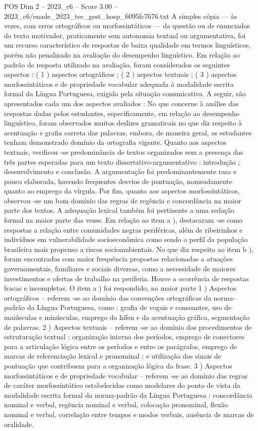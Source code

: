 \begin{textsample}{POS Dim 2 – 2023\_c6 – Score 3.00 – 2023\_c6/enade\_2023\_tec\_gest\_hosp\_6095fc7676.txt}
A simples cópia — às vezes, com erros ortográficos ou morfossintáticos — da questão ou de enunciados do texto motivador, praticamente sem autonomia textual ou argumentativa, foi um recurso característico de respostas de baixa qualidade em termos linguísticos, porém não penalizado na avaliação do desempenho linguístico.
Em relação ao padrão de resposta utilizado na avaliação, foram considerados os seguintes aspectos : ( 1 ) aspectos ortográficos ; ( 2 ) aspectos textuais ; ( 3 ) aspectos morfossintáticos e de propriedade vocabular adequada à modalidade escrita formal da Língua Portuguesa, exigida pela situação comunicativa.
A seguir, são apresentados cada um dos aspectos avaliados : No que concerne à análise das respostas dadas pelos estudantes, especificamente, em relação ao desempenho linguístico, foram observados muitos deslizes gramaticais no que diz respeito à acentuação e grafia correta das palavras, embora, de maneira geral, os estudantes tenham demonstrado domínio da ortografia vigente.
Quanto aos aspectos textuais, verificou -se predominância de textos organizados sem a presença das três partes esperadas para um texto dissertativo-argumentativo : introdução ; desenvolvimento e conclusão.
A argumentação foi predominantemente rasa e pouco elaborada, havendo frequentes desvios de pontuação, nomeadamente quanto ao emprego da vírgula.
Por fim, quanto aos aspectos morfossintáticos, observou -se um bom domínio das regras de regência e concordância na maior parte dos textos.
A adequação lexical também foi pertinente a uma redação formal na maior parte das vezes.
Em relação ao item a ), destacaram -se como respostas a relação entre comunidades negras periféricas, além de ribeirinhos e indivíduos em vulnerabilidade socioeconômica como sendo o perfil da população brasileira mais propenso a riscos socioambientais.
No que diz respeito ao item b ), foram encontradas com maior frequência propostas relacionadas a atuações governamentais, familiares e sociais diversas, como a necessidade de maiores investimentos e ofertas de trabalho na periferia.
Houve a ocorrência de respostas fracas e incompletas.
O item a ) foi respondido, na maior parte 1 ) Aspectos ortográficos – referem -se ao domínio das convenções ortográficas da norma-padrão da Língua Portuguesa, como : grafia de vogais e consoantes, uso de maiúsculas e minúsculas, emprego do hífen e da acentuação gráfica, segmentação de palavras. 2 ) Aspectos textuais – referem -se ao domínio dos procedimentos de estruturação textual : organização interna dos períodos, emprego de conectores para a articulação lógica entre os períodos e entre os parágrafos, emprego de marcas de referenciação lexical e pronominal ; e utilização dos sinais de pontuação que contribuem para a organização lógica da frase. 3 ) Aspectos morfossintáticos e de propriedade vocabular – referem -se ao domínio das regras de caráter morfossintático estabelecidas como modelares do ponto de vista da modalidade escrita formal da norma-padrão da Língua Portuguesa : concordância nominal e verbal, regência nominal e verbal, colocação pronominal, flexão nominal e verbal, correlação entre tempos e modos verbais, ausência de marcas de oralidade.

\end{textsample}
